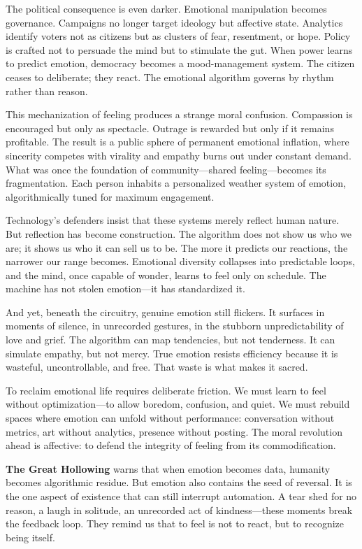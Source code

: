 \documentclass[11pt,twoside]{book}
\begin{document}
The political consequence is even darker.  Emotional manipulation becomes governance.  Campaigns no longer target ideology but affective state.  Analytics identify voters not as citizens but as clusters of fear, resentment, or hope.  Policy is crafted not to persuade the mind but to stimulate the gut.  When power learns to predict emotion, democracy becomes a mood-management system.  The citizen ceases to deliberate; they react.  The emotional algorithm governs by rhythm rather than reason.

This mechanization of feeling produces a strange moral confusion.  Compassion is encouraged but only as spectacle.  Outrage is rewarded but only if it remains profitable.  The result is a public sphere of permanent emotional inflation, where sincerity competes with virality and empathy burns out under constant demand.  What was once the foundation of community—shared feeling—becomes its fragmentation.  Each person inhabits a personalized weather system of emotion, algorithmically tuned for maximum engagement.

Technology’s defenders insist that these systems merely reflect human nature.  But reflection has become construction.  The algorithm does not show us who we are; it shows us who it can sell us to be.  The more it predicts our reactions, the narrower our range becomes.  Emotional diversity collapses into predictable loops, and the mind, once capable of wonder, learns to feel only on schedule.  The machine has not stolen emotion—it has standardized it.

And yet, beneath the circuitry, genuine emotion still flickers.  It surfaces in moments of silence, in unrecorded gestures, in the stubborn unpredictability of love and grief.  The algorithm can map tendencies, but not tenderness.  It can simulate empathy, but not mercy.  True emotion resists efficiency because it is wasteful, uncontrollable, and free.  That waste is what makes it sacred.

To reclaim emotional life requires deliberate friction.  We must learn to feel without optimization—to allow boredom, confusion, and quiet.  We must rebuild spaces where emotion can unfold without performance: conversation without metrics, art without analytics, presence without posting.  The moral revolution ahead is affective: to defend the integrity of feeling from its commodification.

\textbf{The Great Hollowing} warns that when emotion becomes data, humanity becomes algorithmic residue.  But emotion also contains the seed of reversal.  It is the one aspect of existence that can still interrupt automation.  A tear shed for no reason, a laugh in solitude, an unrecorded act of kindness—these moments break the feedback loop.  They remind us that to feel is not to react, but to recognize being itself.
\end{document}
